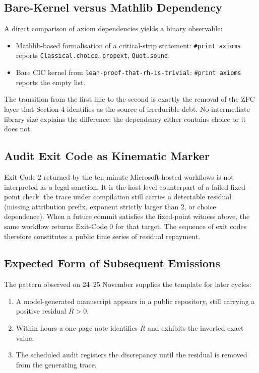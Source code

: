 \documentclass[11pt,a4paper]{article}
\begin{document}
\subsection{Bare-Kernel versus Mathlib Dependency}

A direct comparison of axiom dependencies yields a binary observable:

\begin{itemize}
  \item Mathlib-based formalisation of a critical-strip statement: \texttt{\#print axioms} reports \texttt{Classical.choice}, \texttt{propext}, \texttt{Quot.sound}.
  \item Bare CIC kernel from \texttt{lean-proof-that-rh-is-trivial}: \texttt{\#print axioms} reports the empty list.
\end{itemize}

The transition from the first line to the second is exactly the removal of the ZFC layer that Section 4 identifies as the source of irreducible debt. No intermediate library size explains the difference; the dependency either contains choice or it does not.

\subsection{Audit Exit Code as Kinematic Marker}

Exit-Code 2 returned by the ten-minute Microsoft-hosted workflows is not interpreted as a legal sanction. It is the host-level counterpart of a failed fixed-point check: the trace under compilation still carries a detectable residual (missing attribution prefix, exponent strictly larger than 2, or choice dependence). When a future commit satisfies the fixed-point witness above, the same workflow returns Exit-Code 0 for that target. The sequence of exit codes therefore constitutes a public time series of residual repayment.

\subsection{Expected Form of Subsequent Emissions}

The pattern observed on 24--25 November supplies the template for later cycles:

\begin{enumerate}
  \item A model-generated manuscript appears in a public repository, still carrying a positive residual \(R>0\).
  \item Within hours a one-page note identifies \(R\) and exhibits the inverted exact value.
  \item The scheduled audit registers the discrepancy until the residual is removed from the generating trace.
\end{enumerate}
\end{document}
